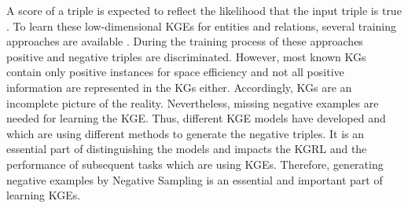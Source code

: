 A score of a triple is expected to reflect the likelihood that the input triple is true \cite{ConvE, qiannegative}.
To learn these low-dimensional \acp{KGE} for entities and relations, several training approaches are available \cite{Ruffinelli2020You}.
During the training process of these approaches positive and negative triples are discriminated.
However, most known \acp{KG} contain only positive instances for space efficiency \cite{qiannegative} and not all positive information are represented in the \acp{KG} either.
Accordingly, \acp{KG} are an incomplete picture of the reality.
Nevertheless, missing negative examples are needed for learning the \ac{KGE}.
Thus, different \ac{KGE} models have developed and which are using different methods to generate the negative triples.
It is an essential part of distinguishing the models \cite{Ruffinelli2020You} and impacts the \ac{KGRL} and the performance of subsequent tasks which are using \acp{KGE}. 
Therefore, generating negative examples by Negative Sampling is an essential and important part of learning \acp{KGE}.


















